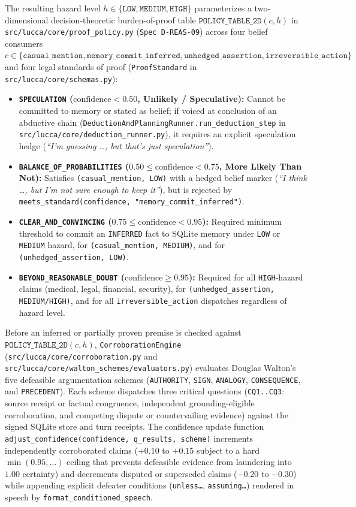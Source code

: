 \documentclass[11pt,a4paper]{article}
\begin{document}
The resulting hazard level $h \in \{\texttt{LOW}, \texttt{MEDIUM}, \texttt{HIGH}\}$ parameterizes a two-dimensional decision-theoretic burden-of-proof table $\texttt{POLICY\_TABLE\_2D}(c, h)$ in \texttt{src/lucca/core/proof\_policy.py} (\texttt{Spec D-REAS-09}) across four belief consumers $c \in \{\texttt{casual\_mention}, \texttt{memory\_commit\_inferred}, \texttt{unhedged\_assertion}, \texttt{irreversible\_action}\}$ and four legal standards of proof (\texttt{ProofStandard} in \texttt{src/lucca/core/schemas.py}):
\begin{itemize}
    \item \textbf{\texttt{SPECULATION} ($\text{confidence} < 0.50$, Unlikely / Speculative):} Cannot be committed to memory or stated as belief; if voiced at conclusion of an abductive chain (\texttt{DeductionAndPlanningRunner.run\_deduction\_step} in \texttt{src/lucca/core/deduction\_runner.py}), it requires an explicit speculation hedge (\emph{``I'm guessing \dots, but that's just speculation''}).
    \item \textbf{\texttt{BALANCE\_OF\_PROBABILITIES} ($0.50 \le \text{confidence} < 0.75$, More Likely Than Not):} Satisfies \texttt{(casual\_mention, LOW)} with a hedged belief marker (\emph{``I think \dots, but I'm not sure enough to keep it''}), but is rejected by \texttt{meets\_standard(confidence, "memory\_commit\_inferred")}.
    \item \textbf{\texttt{CLEAR\_AND\_CONVINCING} ($0.75 \le \text{confidence} < 0.95$):} Required minimum threshold to commit an \texttt{INFERRED} fact to SQLite memory under \texttt{LOW} or \texttt{MEDIUM} hazard, for \texttt{(casual\_mention, MEDIUM)}, and for \texttt{(unhedged\_assertion, LOW)}.
    \item \textbf{\texttt{BEYOND\_REASONABLE\_DOUBT} ($\text{confidence} \ge 0.95$):} Required for all \texttt{HIGH}-hazard claims (medical, legal, financial, security), for \texttt{(unhedged\_assertion, MEDIUM/HIGH)}, and for all \texttt{irreversible\_action} dispatches regardless of hazard level.
\end{itemize}
Before an inferred or partially proven premise is checked against $\texttt{POLICY\_TABLE\_2D}(c, h)$, \texttt{CorroborationEngine} (\texttt{src/lucca/core/corroboration.py} and \texttt{src/lucca/core/walton\_schemes/evaluators.py}) evaluates Douglas Walton's five defeasible argumentation schemes (\texttt{AUTHORITY}, \texttt{SIGN}, \texttt{ANALOGY}, \texttt{CONSEQUENCE}, and \texttt{PRECEDENT}). Each scheme dispatches three critical questions (\texttt{CQ1..CQ3}: source receipt or factual congruence, independent grounding-eligible corroboration, and competing dispute or countervailing evidence) against the signed SQLite store and turn receipts. The confidence update function \texttt{adjust\_confidence(confidence, q\_results, scheme)} increments independently corroborated claims ($+0.10$ to $+0.15$ subject to a hard $\min(0.95, \dots)$ ceiling that prevents defeasible evidence from laundering into $1.00$ certainty) and decrements disputed or superseded claims ($-0.20$ to $-0.30$) while appending explicit defeater conditions (\texttt{unless\dots}, \texttt{assuming\dots}) rendered in speech by \texttt{format\_conditioned\_speech}.
\end{document}
